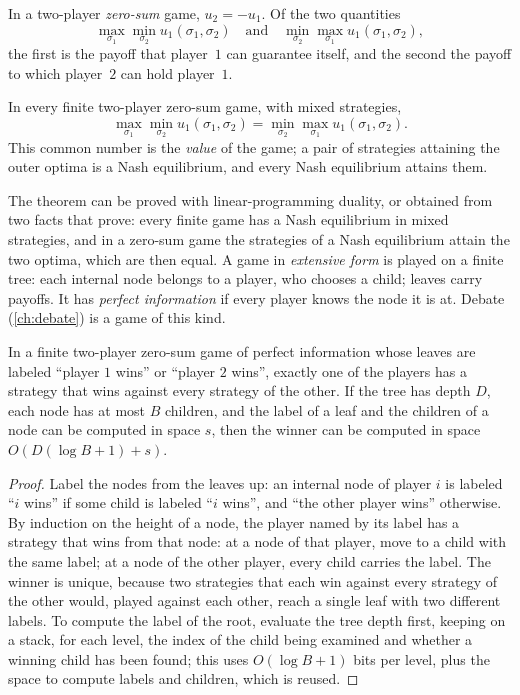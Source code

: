 \begin{refsection}
In a two-player \emph{zero-sum} game, $u_2=-u_1$. Of the two quantities
\[
\max_{\sigma_1}\min_{\sigma_2}u_1(\sigma_1,\sigma_2)\quad\text{and}\quad\min_{\sigma_2}\max_{\sigma_1}u_1(\sigma_1,\sigma_2),
\]
the first is the payoff that player~$1$ can guarantee itself, and the second the payoff to which player~$2$ can hold player~$1$.

\begin{theorem}\label{thm:toolkit:minimax}
In every finite two-player zero-sum game, with mixed strategies,
\[
\max_{\sigma_1}\min_{\sigma_2}u_1(\sigma_1,\sigma_2)=\min_{\sigma_2}\max_{\sigma_1}u_1(\sigma_1,\sigma_2).
\]
This common number is the \emph{value} of the game; a pair of strategies attaining the outer optima is a Nash equilibrium, and every Nash equilibrium attains them.
\end{theorem}

The theorem can be proved with linear-programming duality, or obtained from two facts that \textcite{OsborneRubinstein1994} prove: every finite game has a Nash equilibrium in mixed strategies, and in a zero-sum game the strategies of a Nash equilibrium attain the two optima, which are then equal. A game in \emph{extensive form} is played on a finite tree: each internal node belongs to a player, who chooses a child; leaves carry payoffs. It has \emph{perfect information} if every player knows the node it is at. Debate (\cref{ch:debate}) is a game of this kind.

\begin{theorem}\label{thm:toolkit:backward}
In a finite two-player zero-sum game of perfect information whose leaves are labeled ``player $1$ wins'' or ``player $2$ wins'', exactly one of the players has a strategy that wins against every strategy of the other. If the tree has depth $D$, each node has at most $B$ children, and the label of a leaf and the children of a node can be computed in space $s$, then the winner can be computed in space $O(D(\log B+1)+s)$.
\end{theorem}

\begin{proof}
Label the nodes from the leaves up: an internal node of player $i$ is labeled ``$i$ wins'' if some child is labeled ``$i$ wins'', and ``the other player wins'' otherwise. By induction on the height of a node, the player named by its label has a strategy that wins from that node: at a node of that player, move to a child with the same label; at a node of the other player, every child carries the label. The winner is unique, because two strategies that each win against every strategy of the other would, played against each other, reach a single leaf with two different labels. To compute the label of the root, evaluate the tree depth first, keeping on a stack, for each level, the index of the child being examined and whether a winning child has been found; this uses $O(\log B+1)$ bits per level, plus the space to compute labels and children, which is reused.
\end{proof}


\end{refsection}
